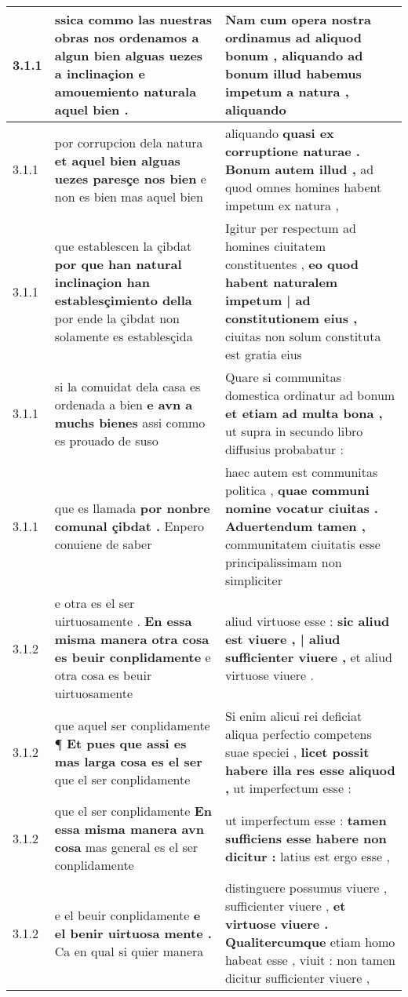 \begin{tabular}{|p{1cm}|p{6.5cm}|p{6.5cm}|}
3.1.1 & ssica commo las nuestras obras nos ordenamos \textbf{ a algun bien alguas uezes a inclinaçion } e amouemiento naturala aquel bien . & Nam cum opera nostra ordinamus ad aliquod bonum , \textbf{ aliquando ad bonum illud habemus impetum a natura , } aliquando \\\hline
3.1.1 & por corrupcion dela natura \textbf{ et aquel bien alguas uezes paresçe nos bien } e non es bien mas aquel bien & aliquando \textbf{ quasi ex corruptione naturae . Bonum autem illud , } ad quod omnes homines habent impetum ex natura , \\\hline
3.1.1 & que establescen la çibdat \textbf{ por que han natural inclinaçion han establesçimiento della } por ende la çibdat non solamente es establesçida & Igitur per respectum ad homines ciuitatem constituentes , \textbf{ eo quod habent naturalem impetum | ad constitutionem eius , } ciuitas non solum constituta est gratia eius \\\hline
3.1.1 & si la comuidat dela casa es ordenada a bien \textbf{ e avn a muchs bienes } assi commo es prouado de suso & Quare si communitas domestica ordinatur ad bonum \textbf{ et etiam ad multa bona , } ut supra in secundo libro diffusius probabatur : \\\hline
3.1.1 & que es llamada \textbf{ por nonbre comunal çibdat . } Enpero conuiene de saber & haec autem est communitas politica , \textbf{ quae communi nomine vocatur ciuitas . Aduertendum tamen , } communitatem ciuitatis esse principalissimam non simpliciter \\\hline
3.1.2 & e otra es el ser uirtuosamente . \textbf{ En essa misma manera otra cosa es beuir conplidamente } e otra cosa es beuir uirtuosamente & aliud virtuose esse : \textbf{ sic aliud est viuere , | aliud sufficienter viuere , } et aliud virtuose viuere . \\\hline
3.1.2 & que aquel ser conplidamente ¶ \textbf{ Et pues que assi es mas larga cosa es el ser } que el ser conplidamente & Si enim alicui rei deficiat aliqua perfectio competens suae speciei , \textbf{ licet possit habere illa res esse aliquod , } ut imperfectum esse : \\\hline
3.1.2 & que el ser conplidamente \textbf{ En essa misma manera avn cosa } mas general es el ser conplidamente & ut imperfectum esse : \textbf{ tamen sufficiens esse habere non dicitur : } latius est ergo esse , \\\hline
3.1.2 & e el beuir conplidamente \textbf{ e el benir uirtuosa mente . } Ca en qual si quier manera & distinguere possumus viuere , sufficienter viuere , \textbf{ et virtuose viuere . Qualitercumque } etiam homo habeat esse , viuit : non tamen dicitur sufficienter viuere , \\\hline

\end{tabular}
